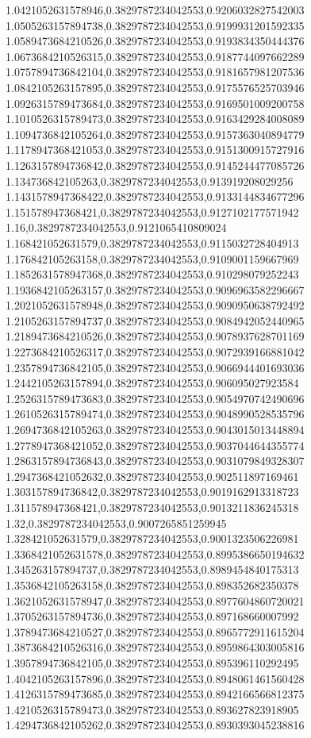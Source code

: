 1.0421052631578946,0.3829787234042553,0.9206032827542003
1.0505263157894738,0.3829787234042553,0.9199931201592335
1.0589473684210526,0.3829787234042553,0.9193834350444376
1.0673684210526315,0.3829787234042553,0.9187744097662289
1.0757894736842104,0.3829787234042553,0.9181657981207536
1.0842105263157895,0.3829787234042553,0.9175576525703946
1.0926315789473684,0.3829787234042553,0.9169501009200758
1.1010526315789473,0.3829787234042553,0.9163429284008089
1.1094736842105264,0.3829787234042553,0.9157363040894779
1.1178947368421053,0.3829787234042553,0.9151300915727916
1.1263157894736842,0.3829787234042553,0.9145244477085726
1.134736842105263,0.3829787234042553,0.913919208029256
1.1431578947368422,0.3829787234042553,0.9133144834677296
1.151578947368421,0.3829787234042553,0.9127102177571942
1.16,0.3829787234042553,0.9121065410809024
1.168421052631579,0.3829787234042553,0.9115032728404913
1.176842105263158,0.3829787234042553,0.9109001159667969
1.1852631578947368,0.3829787234042553,0.910298079252243
1.1936842105263157,0.3829787234042553,0.9096963582296667
1.2021052631578948,0.3829787234042553,0.9090950638792492
1.2105263157894737,0.3829787234042553,0.9084942052440965
1.2189473684210526,0.3829787234042553,0.9078937628701169
1.2273684210526317,0.3829787234042553,0.9072939166881042
1.2357894736842105,0.3829787234042553,0.9066944401693036
1.2442105263157894,0.3829787234042553,0.906095027923584
1.2526315789473683,0.3829787234042553,0.9054970742490696
1.2610526315789474,0.3829787234042553,0.9048990528535796
1.2694736842105263,0.3829787234042553,0.9043015013448894
1.2778947368421052,0.3829787234042553,0.9037044644355774
1.2863157894736843,0.3829787234042553,0.9031079849328307
1.2947368421052632,0.3829787234042553,0.902511897169461
1.303157894736842,0.3829787234042553,0.9019162913318723
1.311578947368421,0.3829787234042553,0.9013211836245318
1.32,0.3829787234042553,0.9007265851259945
1.328421052631579,0.3829787234042553,0.9001323506226981
1.3368421052631578,0.3829787234042553,0.8995386650194632
1.345263157894737,0.3829787234042553,0.8989454840175313
1.3536842105263158,0.3829787234042553,0.898352682350378
1.3621052631578947,0.3829787234042553,0.8977604860720021
1.3705263157894736,0.3829787234042553,0.897168660007992
1.3789473684210527,0.3829787234042553,0.8965772911615204
1.3873684210526316,0.3829787234042553,0.8959864303005816
1.3957894736842105,0.3829787234042553,0.895396110292495
1.4042105263157896,0.3829787234042553,0.8948061461560428
1.4126315789473685,0.3829787234042553,0.8942166566812375
1.4210526315789473,0.3829787234042553,0.893627823918905
1.4294736842105262,0.3829787234042553,0.8930393045238816
